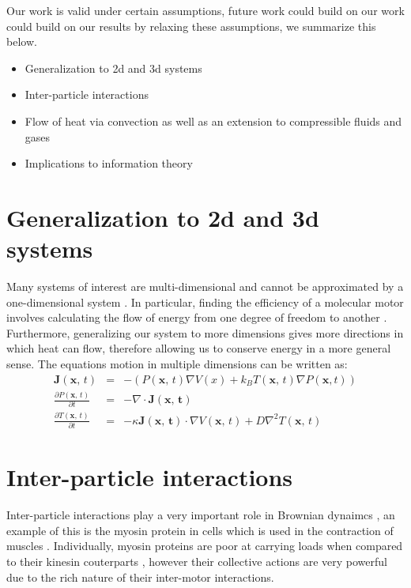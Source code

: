 Our work is valid under certain assumptions, future work could build on our work could build on our results by relaxing these assumptions, we summarize this below.
\begin{itemize}
    \item{Generalization to 2d and 3d systems}
    \item{Inter-particle interactions}
    \item{Flow of heat via convection as well as an extension to compressible fluids and gases}
    \item{Implications to information theory}
\end{itemize}

\section{Generalization to 2d and 3d systems}
Many systems of interest are multi-dimensional and cannot be approximated by a one-dimensional system \cite{KellerBustamante2000,Magnasco1994,Reimann2001,ChallisJack2014,M.W.Jack2016}. In particular, finding the efficiency of a molecular motor involves calculating the flow of energy from one degree of freedom to another \cite{M.W.Jack2016}. Furthermore, generalizing our system to more dimensions gives more directions in which heat can flow, therefore allowing us to conserve energy in a more general sense. The equations motion in multiple dimensions can be written as:
\begin{eqnarray}
\mathbf{J}(\mathbf{x}, \, t) &=& - (P(\mathbf{x}, \, t) \nabla V(x) + k_B T(\mathbf{x}, \, t) \nabla P(\mathbf{x}, t)) \\
\frac{\partial P(\mathbf{x}, \, t)}{\partial t} &=& -\nabla \cdot \mathbf{J(\mathbf{x}, \, t)} \\
\frac{\partial T(\mathbf{x}, \, t)}{\partial t} &=& -\kappa \mathbf{J(\mathbf{x}, \, t)} \cdot \nabla V(\mathbf{x}, \, t) + D \nabla^2 T(\mathbf{x}, \, t)
\end{eqnarray}

\section{Inter-particle interactions}
Inter-particle interactions play a very important role in Brownian dynaimcs \cite{leibler1990physical,Leibler1993}, an example of this is the myosin protein in cells which is used in the contraction of muscles \cite{TyskaWarshaw2002}. Individually, myosin proteins are poor at carrying loads when compared to their kinesin couterparts \cite{TyskaWarshaw2002}, however their collective actions are very powerful due to the rich nature of their inter-motor interactions.

